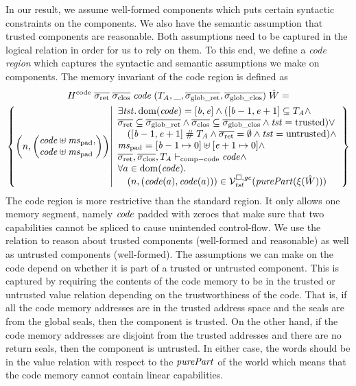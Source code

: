 \begin{jversion}
In our result, we assume well-formed components which puts certain syntactic constraints on the components.
We also have the semantic assumption that trusted components are reasonable.
Both assumptions need to be captured in the logical relation in order for us to rely on them.
To this end, we define a \emph{code region} which captures the syntactic and semantic assumptions we make on components.
The memory invariant of the code region is defined as
\begin{multline*}
  H^\mathrm{code} \; \sigrets \; \sigcloss \; \code \; (\ta,\_,\gsigrets,\gsigcloss) \; \hat{W} =\\
  \left\{\npair{\arraycolsep=0pt\left(\array{l}\code \uplus \mspad,\\ \code \uplus \mspad\endarray\right)} \middle|
    \begin{array}{l}
      \exists \trust \ldotp
    \dom(\code) = [\baddr,\eaddr] \wedge ([\baddr - 1, \eaddr + 1] \subseteq \ta
      \wedge\\
      \sigrets \subseteq \gsigrets \wedge \sigcloss \subseteq \gsigcloss \wedge \trust = \trusted) \vee \\
      \quad ([\baddr-1,\eaddr+1]\mathrel{\#} \ta \wedge \sigrets = \emptyset \wedge \trust =\untrusted) \wedge \\
      \mspad = [\baddr-1 \mapsto 0] \uplus [\eaddr + 1 \mapsto 0]\wedge\\
      \sigrets,\sigcloss,\ta \vdash_{\mathrm{comp-code}} \code \wedge\\
      \forall a \in \dom(\code)\ldotp\\
      \quad\npair{(\code(a),\code(a))} \in \lrvg{\trust}(\purePart{\xi(\hat{W})})
    \end{array}
  \right\}
\end{multline*}
The code region is more restrictive than the standard region.
It only allows one memory segment, namely $\mathit{code}$ padded with zeroes that make sure that two capabilities cannot be spliced to cause unintended control-flow.
We use the relation to reason about trusted components (well-formed and reasonable) as well as untrusted components (well-formed).
The assumptions we can make on the code depend on whether it is part of a trusted or untrusted component.
This is captured by requiring the contents of the code memory to be in the trusted or untrusted value relation depending on the trustworthiness of the code.
That is, if all the code memory addresses are in the trusted address space and the seals are from the global seals, then the component is trusted.
On the other hand, if the code memory addresses are disjoint from the trusted addresses and there are no return seals, then the component is untrusted.
In either case, the words should be in the value relation with respect to the $\purePart{}$ of the world which means that the code memory cannot contain linear capabilities.


\end{jversion}
